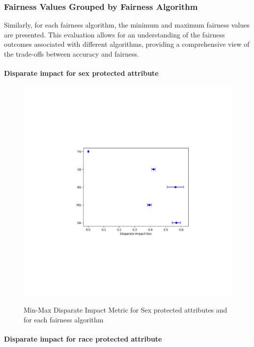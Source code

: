\newpage
\subsubsection{Fairness Values Grouped by Fairness Algorithm}

Similarly, for each fairness algorithm, the minimum and maximum fairness values are presented. This evaluation allows for an understanding of the fairness outcomes associated with different algorithms, providing a comprehensive view of the trade-offs between accuracy and fairness.

\paragraph{Disparate impact for sex protected attribute}

\begin{figure}[H]
    \centering
    \includegraphics[width=1.0\textwidth, height=1.0\textwidth]{dis.png}
    \label{fig:dis}
    \caption{Min-Max Disparate Impact Metric for Sex protected attributes and for each fairness algorithm}
\end{figure}

\paragraph{Disparate impact for race protected attribute}

